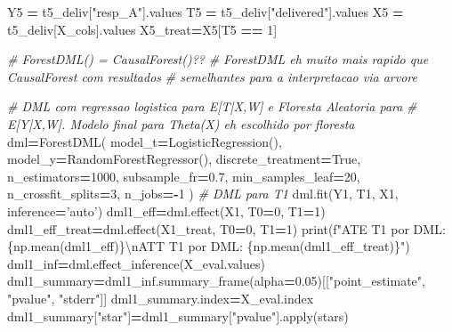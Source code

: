 \documentclass[
]{article}
\newenvironment{Shaded}{\begin{snugshade}}{\end{snugshade}}
\newcommand{\BuiltInTok}[1]{#1}
\newcommand{\CharTok}[1]{\textcolor[rgb]{0.31,0.60,0.02}{#1}}
\newcommand{\CommentTok}[1]{\textcolor[rgb]{0.56,0.35,0.01}{\textit{#1}}}
\newcommand{\DecValTok}[1]{\textcolor[rgb]{0.00,0.00,0.81}{#1}}
\newcommand{\FloatTok}[1]{\textcolor[rgb]{0.00,0.00,0.81}{#1}}
\newcommand{\NormalTok}[1]{#1}
\newcommand{\OperatorTok}[1]{\textcolor[rgb]{0.81,0.36,0.00}{\textbf{#1}}}
\newcommand{\SpecialCharTok}[1]{\textcolor[rgb]{0.00,0.00,0.00}{#1}}
\newcommand{\SpecialStringTok}[1]{\textcolor[rgb]{0.31,0.60,0.02}{#1}}
\newcommand{\StringTok}[1]{\textcolor[rgb]{0.31,0.60,0.02}{#1}}
\newcommand{\VariableTok}[1]{\textcolor[rgb]{0.00,0.00,0.00}{#1}}
\begin{document}
\begin{Shaded}
\begin{Highlighting}[]
{\NormalTok{Y5 }\OperatorTok{=}\NormalTok{ t5_deliv[}\StringTok{"resp_A"}\NormalTok{].values}
\NormalTok{T5 }\OperatorTok{=}\NormalTok{ t5_deliv[}\StringTok{"delivered"}\NormalTok{].values}
\NormalTok{X5 }\OperatorTok{=}\NormalTok{ t5_deliv[X_cols].values}
\NormalTok{X5_treat}\OperatorTok{=}\NormalTok{X5[T5 }\OperatorTok{==} \DecValTok{1}\NormalTok{]}

\CommentTok{# ForestDML() = CausalForest()??}
\CommentTok{# ForestDML eh muito mais rapido que CausalForest com resultados }
\CommentTok{# semelhantes para a interpretacao via arvore}

\CommentTok{# DML com regressao logistica para E[T|X,W] e Floresta Aleatoria para}
\CommentTok{# E[Y|X,W]. Modelo final para Theta(X) eh escolhido por floresta}
\NormalTok{dml}\OperatorTok{=}\NormalTok{ForestDML(}
\NormalTok{    model_t}\OperatorTok{=}\NormalTok{LogisticRegression(),}
\NormalTok{    model_y}\OperatorTok{=}\NormalTok{RandomForestRegressor(),}
\NormalTok{    discrete_treatment}\OperatorTok{=}\VariableTok{True}\NormalTok{,}
\NormalTok{    n_estimators}\OperatorTok{=}\DecValTok{1000}\NormalTok{,}
\NormalTok{    subsample_fr}\OperatorTok{=}\FloatTok{0.7}\NormalTok{,}
\NormalTok{    min_samples_leaf}\OperatorTok{=}\DecValTok{20}\NormalTok{,}
\NormalTok{    n_crossfit_splits}\OperatorTok{=}\DecValTok{3}\NormalTok{,}
\NormalTok{    n_jobs}\OperatorTok{=-}\DecValTok{1}
\NormalTok{)}
\CommentTok{# DML para T1}
\NormalTok{dml.fit(Y1, T1, X1, inference}\OperatorTok{=}\StringTok{'auto'}\NormalTok{)}
\NormalTok{dml1_eff}\OperatorTok{=}\NormalTok{dml.effect(X1, T0}\OperatorTok{=}\DecValTok{0}\NormalTok{, T1}\OperatorTok{=}\DecValTok{1}\NormalTok{)}
\NormalTok{dml1_eff_treat}\OperatorTok{=}\NormalTok{dml.effect(X1_treat, T0}\OperatorTok{=}\DecValTok{0}\NormalTok{, T1}\OperatorTok{=}\DecValTok{1}\NormalTok{)}
\BuiltInTok{print}\NormalTok{(}\SpecialStringTok{f"ATE T1 por DML: }\SpecialCharTok{\{np.}\NormalTok{mean(dml1_eff)}\SpecialCharTok{\}}\CharTok{\textbackslash{}n}\SpecialStringTok{ATT T1 por DML: }\SpecialCharTok{\{np.}\NormalTok{mean(dml1_eff_treat)}\SpecialCharTok{\}}\SpecialStringTok{"}\NormalTok{)}
\NormalTok{dml1_inf}\OperatorTok{=}\NormalTok{dml.effect_inference(X_eval.values)}
\NormalTok{dml1_summary}\OperatorTok{=}\NormalTok{dml1_inf.summary_frame(alpha}\OperatorTok{=}\FloatTok{0.05}\NormalTok{)[[}\StringTok{"point_estimate"}\NormalTok{, }\StringTok{"pvalue"}\NormalTok{, }\StringTok{"stderr"}\NormalTok{]]}
\NormalTok{dml1_summary.index}\OperatorTok{=}\NormalTok{X_eval.index}
\NormalTok{dml1_summary[}\StringTok{"star"}\NormalTok{]}\OperatorTok{=}\NormalTok{dml1_summary[}\StringTok{"pvalue"}\NormalTok{].}\BuiltInTok{apply}\NormalTok{(stars)}
}
\end{Highlighting}
\end{Shaded}
\end{document}
